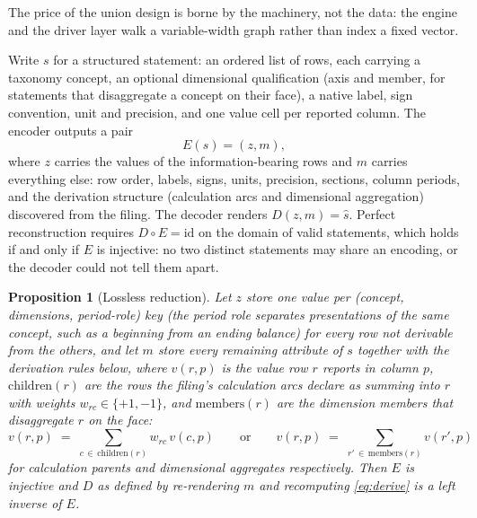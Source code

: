 \documentclass[11pt]{article}
\newtheorem{proposition}{Proposition}
\begin{document}
The price of the union design is borne by the machinery, not the data: the engine and the driver layer walk a variable-width graph rather than index a fixed vector.

Write $s$ for a structured statement: an ordered list of rows, each carrying a taxonomy concept, an optional dimensional qualification (axis and member, for statements that disaggregate a concept on their face), a native label, sign convention, unit and precision, and one value cell per reported column. The encoder outputs a pair
\begin{equation}
E(s) = (z, m),
\end{equation}
where $z$ carries the values of the information-bearing rows and $m$ carries everything else: row order, labels, signs, units, precision, sections, column periods, and the derivation structure (calculation arcs and dimensional aggregation) discovered from the filing. The decoder renders $D(z, m) = \hat{s}$. Perfect reconstruction requires $D \circ E = \mathrm{id}$ on the domain of valid statements, which holds if and only if $E$ is injective: no two distinct statements may share an encoding, or the decoder could not tell them apart.

\begin{proposition}[Lossless reduction]
\label{prop:injective}
Let $z$ store one value per (concept, dimensions, period-role) key (the period role separates presentations of the same concept, such as a beginning from an ending balance) for every row not derivable from the others, and let $m$ store every remaining attribute of $s$ together with the derivation rules below, where $v(r, p)$ is the value row $r$ reports in column $p$, $\mathrm{children}(r)$ are the rows the filing's calculation arcs declare as summing into $r$ with weights $w_{rc} \in \{+1, -1\}$, and $\mathrm{members}(r)$ are the dimension members that disaggregate $r$ on the face:
\begin{equation}
v(r, p) \;=\; \sum_{c \,\in\, \mathrm{children}(r)} w_{rc}\, v(c, p)
\qquad\text{or}\qquad
v(r, p) \;=\; \sum_{r' \,\in\, \mathrm{members}(r)} v(r', p)
\label{eq:derive}
\end{equation}
for calculation parents and dimensional aggregates respectively. Then $E$ is injective and $D$ as defined by re-rendering $m$ and recomputing \eqref{eq:derive} is a left inverse of $E$.
\end{proposition}
\end{document}

